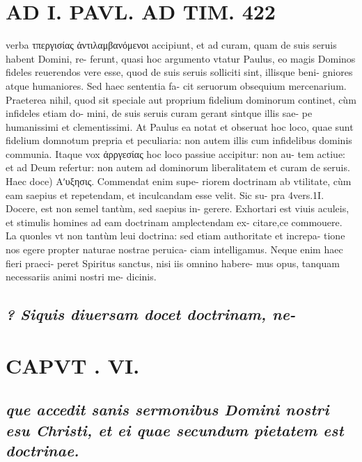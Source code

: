 \documentclass{article}
\begin{document}
\begin{pages}
\section*{AD I. PAVL. AD TIM. 422 }
\marginpar{[ p.]}\pstart verba τπεργισίας ἀντιλαμβανόμενοι accipiunt, et ad curam, quam de suis seruis habent Domini, re- ferunt, quasi hoc argumento vtatur Paulus, eo magis Dominos fideles reuerendos vere esse, quod de suis seruis solliciti sint, illisque beni- gniores atque humaniores. Sed haec sententia fa- cit seruorum obsequium mercenarium. Praeterea nihil, quod sit speciale aut proprium fidelium dominorum continet, cùm infideles etiam do- mini, de suis seruis curam gerant sintque illis sae- pe humanissimi et clementissimi. At Paulus ea notat et obseruat hoc loco, quae sunt fidelium domnotum prepria et peculiaria: non autem illis cum infidelibus dominis communia. Itaque vox ἀρργεσίας hoc loco passiue accipitur: non au- tem actiue: et ad Deum refertur: non autem ad dominorum liberalitatem et curam de seruis.  \pend\pstart Haec doce) Αʹυξησις. Commendat enim supe- riorem doctrinam ab vtilitate, cùm eam saepius et repetendam, et inculcandam esse velit. Sic su- pra 4vers.1I.  \pend\pstart Docere, est non semel tantùm, sed saepius in- gerere. Exhortari est viuis aculeis, et stimulis homines ad eam doctrinam amplectendam ex- citare,ce commouere. La quonles vt non tantùm leui doctrina: sed etiam authoritate et increpa- tione nos egere propter naturae nostrae peruica- ciam intelligamus. Neque enim haec fieri praeci- peret Spiritus sanctus, nisi iis omnino habere- mus opus, tanquam necessariis animi nostri me- dicinis.  \pend
{}
{}
\subsection*{\textit{? Siquis diuersam docet doctrinam, ne- }}
\section*{CAPVT . VI. }
\marginpar{[ p.423 ]}
{}
\subsection*{\textit{que accedit sanis sermonibus Domini nostri esu Christi, et ei quae secundum pietatem est doctrinae. }}
{}

\end{pages}
\end{document}
